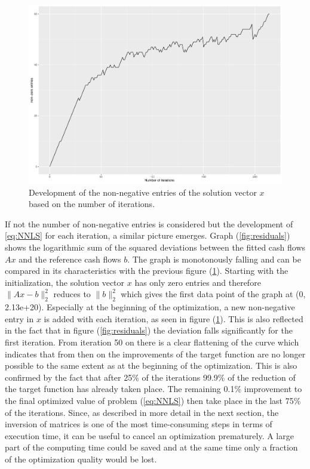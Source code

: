 \begin{figure}
	\centering
	\includegraphics[width=\textwidth]{figures/chapter_NNLS/number_iterations}
	\caption{Development of the non-negative entries of the solution vector $x$ based on the number of iterations.}
	\label{fig:iterations}
\end{figure}

If not the number of non-negative entries is considered but the development of \ref{eq:NNLS} for each iteration, a similar picture emerges. Graph (\ref{fig:residuals}) shows the logarithmic sum of the squared deviations between the fitted cash flows $Ax$ and the reference cash flows $b$. The graph is monotonously falling and can be compared in its characteristics with the previous figure (\ref{fig:iterations}). Starting with the initialization, the solution vector $x$ has only zero entries and therefore $\lVert Ax -b \rVert_2^2$ reduces to $\lVert b \rVert_2^2$ which gives the first data point of the graph at (0, 2.13e+20). Especially at the beginning of the optimization, a new non-negative entry in $x$ is added with each iteration, as seen in figure (\ref{fig:iterations}). This is also reflected in the fact that in figure (\ref{fig:residuals}) the deviation falls significantly for the first iteration. From iteration 50 on there is a clear flattening of the curve which indicates that from then on the improvements of the target function are no longer possible to the same extent as at the beginning of the optimization. This is also confirmed by the fact that after 25\% of the iterations 99.9\% of the reduction of the target function has already taken place. The remaining 0.1\% improvement to the final optimized value of problem (\ref{eq:NNLS}) then take place in the last 75\% of the iterations. Since, as described in more detail in the next section, the inversion of matrices is one of the most time-consuming steps in terms of execution time, it can be useful to cancel an optimization prematurely.  A large part of the computing time could be saved and at the same time only a fraction of the optimization quality would be lost. 

